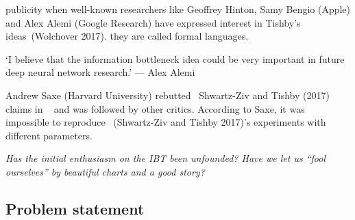 \documentclass[
  letterpaper,
  12pt,
  british]{tufte-book}
\renewenvironment{quote}{
  \list{}{\leftmargin=3.5cm\topsep=0pt}
  \item\relax\small\itshape
}
{\endlist}
\theoremstyle{plain}
\theoremstyle{plain}
\theoremstyle{definition}
\theoremstyle{remark}
\begin{document}
publicity when well-known researchers like Geoffrey Hinton, Samy
Bengio (Apple) and Alex Alemi (Google Research) have expressed interest
in Tishby's ideas~(Wolchover
2017).
they are called formal languages.

\begin{quote}
`I believe that the information bottleneck idea could be very important
in future deep neural network research.' --- Alex Alemi
\end{quote}

Andrew Saxe (Harvard University) rebutted ~Shwartz-Ziv and Tishby
(2017)
claims in ~ and was followed by other critics. According to Saxe, it was
impossible to reproduce ~(Shwartz-Ziv and Tishby
2017)'s
experiments with different parameters.

\emph{Has the initial enthusiasm on the {IBT} been unfounded? Have we
let us ``fool ourselves'' by beautiful charts and a good story?}

\hypertarget{problem-statement}{%
\subsection{Problem statement}\label{problem-statement}}
\end{document}
